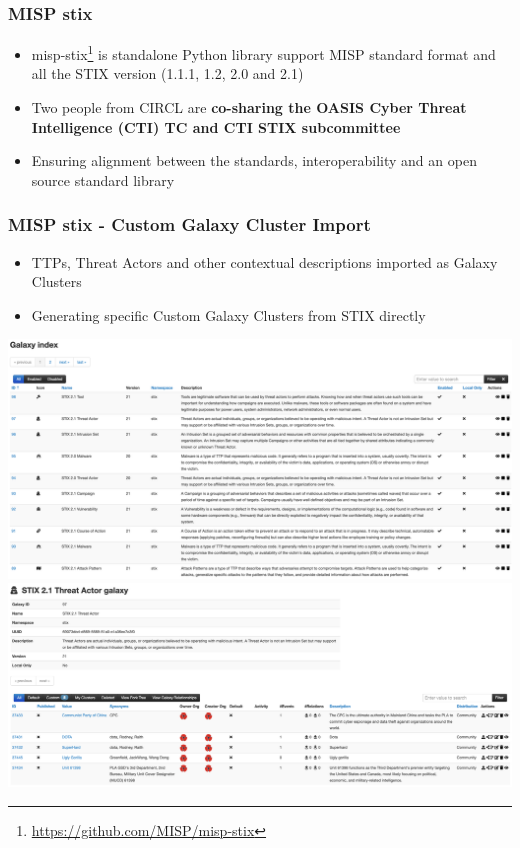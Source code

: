 \begin{frame}
     \frametitle{MISP stix}
     \begin{itemize}
        \item misp-stix\footnote{\url{https://github.com/MISP/misp-stix}} is standalone Python library support MISP standard format and all the STIX version (1.1.1, 1.2, 2.0 and 2.1)
        \item Two people from CIRCL are {\bf co-sharing the OASIS Cyber Threat Intelligence (CTI) TC and CTI STIX subcommittee}
        \item Ensuring alignment between the standards, interoperability and an open source standard library
     \end{itemize}
\end{frame}

\begin{frame}
     \frametitle{MISP stix - Custom Galaxy Cluster Import}
     \begin{itemize}
	\item TTPs, Threat Actors and other contextual descriptions imported as Galaxy Clusters
	\item Generating specific Custom Galaxy Clusters from STIX directly
     \end{itemize}
     \begin{center}
	  \includegraphics[scale=0.1]{stix-cluster.png}
	  \includegraphics[scale=0.1]{stix-cluster2.png}
     \end{center}
\end{frame}

